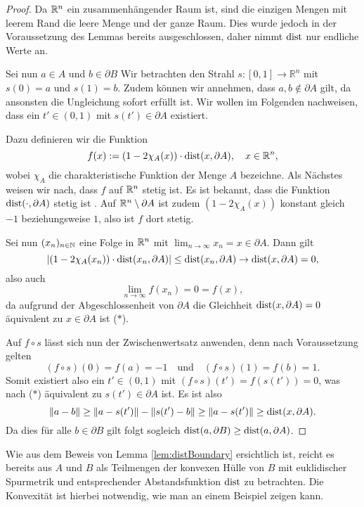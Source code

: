 \begin{proof}
  Da $\mathbb{R}^n$ ein zusammenhängender Raum ist, sind die einzigen Mengen mit leerem Rand die leere Menge und der ganze Raum.
  Dies wurde jedoch in der Voraussetzung des Lemmas bereits ausgeschlossen, daher nimmt $\operatorname{dist}$ nur endliche Werte an.

  Sei nun $a \in A$ und $b \in \partial B$
  Wir betrachten den Strahl $s \colon [0,1] \to \mathbb{R}^n$ mit $s(0) = a$ und $s(1) = b$.
  Zudem können wir annehmen, dass $a,b \not\in \partial A$ gilt, da ansonsten die Ungleichung sofort erfüllt ist.
  Wir wollen im Folgenden nachweisen, dass ein $t' \in (0,1)$ mit $s(t') \in \partial A$ existiert.

  Dazu definieren wir die Funktion
  $$
  f(x) := (1 - 2\chi_A(x)) \cdot \operatorname{dist}(x, \partial A), \quad x \in \mathbb{R}^n,
  $$
  wobei $\chi_A$ die charakteristische Funktion der Menge $A$ bezeichne.
  Als Nächstes weisen wir nach, dass $f$ auf $\mathbb{R}^n$ stetig ist.
  Es ist bekannt, dass die Funktion $\operatorname{dist}(\cdot, \partial A)$ stetig ist \cite{koenigsberger}.
  Auf $\mathbb{R}^n \setminus \partial A$ ist zudem $(1 - 2\chi_A(x))$ konstant gleich $-1$ beziehungsweise $1$, also ist $f$ dort stetig.

  Sei nun $(x_n)_{n \in \mathbb{N}}$ eine Folge in $\mathbb{R}^n$ mit $\lim_{n \to \infty} x_n = x \in \partial A$.
  Dann gilt
  $$
  |(1 - 2\chi_A(x_n)) \cdot \operatorname{dist}(x_n, \partial A)| 
  \leq \operatorname{dist}(x_n,\partial A)
  \to \operatorname{dist}(x,\partial A) 
  = 0,
  $$
  also auch 
  $$
  \lim_{n \to \infty} f(x_n) = 0 = f(x),
  $$
  da aufgrund der Abgeschlossenheit von $\partial A$ die Gleichheit $\operatorname{dist}(x,\partial A) = 0$ äquivalent zu $x \in \partial A$ ist ($\ast$).

  Auf $f \circ s$ lässt sich nun der Zwischenwertsatz anwenden, denn nach Voraussetzung gelten
  $$
  (f \circ s)(0) = f(a) = -1 \quad\text{und}\quad (f \circ s)(1) = f(b) = 1.
  $$
  Somit existiert also ein $t' \in (0,1)$ mit $(f\circ s)(t') = f(s(t')) = 0$, was nach ($\ast$) äquivalent zu $s(t') \in \partial A$ ist.
  Es ist also
  $$
  \lVert a - b \rVert \geq \lVert a - s(t') \rVert - \lVert s(t') - b \rVert \geq \lVert a - s(t') \rVert \geq \operatorname{dist}(x,\partial A).
  $$
  Da dies für alle $b \in \partial B$ gilt folgt sogleich $ \operatorname{dist}(a, \partial B) \geq \operatorname{dist}(a, \partial A)$.
\end{proof}

\begin{bem}
  Wie aus dem Beweis von Lemma \ref{lem:distBoundary} ersichtlich ist, reicht es bereits aus $A$ und $B$ als Teilmengen der konvexen Hülle von $B$ mit euklidischer Spurmetrik und entsprechender Abstandsfunktion $\operatorname{dist}$ zu betrachten.
  Die Konvexität ist hierbei notwendig, wie man an einem Beispiel zeigen kann.
\end{bem}

